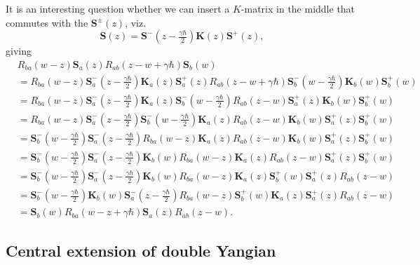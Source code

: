 \documentclass[11pt]{report}
\theoremstyle{definition}
\theoremstyle{remark}
\theoremstyle{remark}
\begin{document}
It is an interesting question whether we can insert a $K$-matrix in the middle that commutes with the $\mathbf{S}^\pm(z)$, viz.
\begin{equation*}
\mathbf{S}(z) = \mathbf{S}^-(z-\tfrac{\gamma\hbar}{2}) \mathbf{K}(z) \mathbf{S}^+(z),
\end{equation*}
giving
\begin{align*}
&R_{ba}(w-z) \mathbf{S}_a(z) R_{ab}(z-w+\gamma\hbar) \mathbf{S}_b(w) \\
&= R_{ba}(w-z) \mathbf{S}_a^-(z-\tfrac{\gamma\hbar}{2}) \mathbf{K}_a(z) \mathbf{S}_a^+(z) R_{ab}(z-w+\gamma\hbar) \mathbf{S}_b^-(w-\tfrac{\gamma\hbar}{2}) \mathbf{K}_b(w) \mathbf{S}_b^+(w) \\
&= R_{ba}(w-z) \mathbf{S}_a^-(z-\tfrac{\gamma\hbar}{2}) \mathbf{K}_a(z) \mathbf{S}_b^-(w-\tfrac{\gamma\hbar}{2}) R_{ab}(z-w) \mathbf{S}_a^+(z) \mathbf{K}_b(w) \mathbf{S}_b^+(w) \\
&= R_{ba}(w-z) \mathbf{S}_a^-(z-\tfrac{\gamma\hbar}{2}) \mathbf{S}_b^-(w-\tfrac{\gamma\hbar}{2}) \mathbf{K}_a(z) R_{ab}(z-w) \mathbf{K}_b(w) \mathbf{S}_a^+(z) \mathbf{S}_b^+(w) \\
&= \mathbf{S}_b^-(w-\tfrac{\gamma\hbar}{2}) \mathbf{S}_a^-(z-\tfrac{\gamma\hbar}{2}) R_{ba}(w-z) \mathbf{K}_a(z) R_{ab}(z-w) \mathbf{K}_b(w) \mathbf{S}_a^+(z) \mathbf{S}_b^+(w) \\
&= \mathbf{S}_b^-(w-\tfrac{\gamma\hbar}{2}) \mathbf{S}_a^-(z-\tfrac{\gamma\hbar}{2}) \mathbf{K}_b(w) R_{ba}(w-z) \mathbf{K}_a(z) R_{ab}(z-w) \mathbf{S}_a^+(z) \mathbf{S}_b^+(w) \\
&= \mathbf{S}_b^-(w-\tfrac{\gamma\hbar}{2}) \mathbf{S}_a^-(z-\tfrac{\gamma\hbar}{2}) \mathbf{K}_b(w) R_{ba}(w-z) \mathbf{K}_a(z) \mathbf{S}_b^+(w) \mathbf{S}_a^+(z) R_{ab}(z-w) \\
&= \mathbf{S}_b^-(w-\tfrac{\gamma\hbar}{2}) \mathbf{K}_b(w) \mathbf{S}_a^-(z-\tfrac{\gamma\hbar}{2}) R_{ba}(w-z) \mathbf{S}_b^+(w) \mathbf{K}_a(z) \mathbf{S}_a^+(z) R_{ab}(z-w) \\
&= \mathbf{S}_b(w) R_{ba}(w-z+\gamma\hbar) \mathbf{S}_a(z) R_{ab}(z-w).
\end{align*}

\subsection{Central extension of double Yangian}
\end{document}
